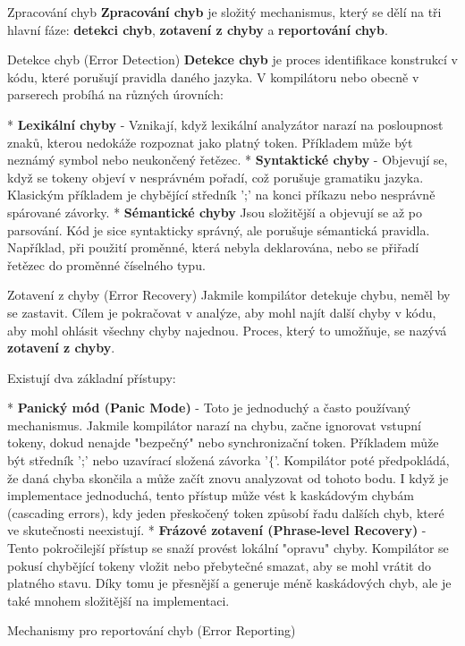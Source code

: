 \chap Zpracování chyb 
{\bf Zpracování chyb} je složitý mechanismus, který se dělí na tři hlavní fáze: {\bf detekci chyb}, {\bf zotavení z chyby} a {\bf reportování chyb}.

\sec Detekce chyb (Error Detection)
{\bf Detekce chyb} je proces identifikace konstrukcí v kódu, které porušují pravidla daného jazyka. V kompilátoru nebo obecně v parserech probíhá na různých úrovních: 

\begitems
* {\bf Lexikální chyby} - Vznikají, když lexikální analyzátor narazí na posloupnost znaků, kterou nedokáže rozpoznat jako platný token. Příkladem může být neznámý symbol nebo neukončený řetězec.
* {\bf Syntaktické chyby} - Objevují se, když se tokeny objeví v nesprávném pořadí, což porušuje gramatiku jazyka. Klasickým příkladem je chybějící středník ';' na konci příkazu nebo nesprávně spárované závorky.
* {\bf Sémantické chyby} Jsou složitější a objevují se až po parsování. Kód je sice syntakticky správný, ale porušuje sémantická pravidla. Například, při použití proměnné, která nebyla deklarována, nebo se přiřadí řetězec do proměnné číselného typu.
\enditems

\sec Zotavení z chyby (Error Recovery)
Jakmile kompilátor detekuje chybu, neměl by se zastavit. Cílem je pokračovat v analýze, aby mohl najít další chyby v kódu, aby mohl ohlásit všechny chyby najednou. Proces, který to umožňuje, se nazývá {\bf zotavení z chyby}.

Existují dva základní přístupy:

\begitems
* {\bf Panický mód (Panic Mode)} - Toto je jednoduchý a často používaný mechanismus. Jakmile kompilátor narazí na chybu, začne ignorovat vstupní tokeny, dokud nenajde "bezpečný" nebo synchronizační token. Příkladem může být středník ';' nebo uzavírací složená závorka '$\{$'. Kompilátor poté předpokládá, že daná chyba skončila a může začít znovu analyzovat od tohoto bodu. I když je implementace jednoduchá, tento přístup může vést k kaskádovým chybám (cascading errors), kdy jeden přeskočený token způsobí řadu dalších chyb, které ve skutečnosti neexistují.
* {\bf Frázové zotavení (Phrase-level Recovery)} - Tento pokročilejší přístup se snaží provést lokální "opravu" chyby. Kompilátor se pokusí chybějící tokeny vložit nebo přebytečné smazat, aby se mohl vrátit do platného stavu. Díky tomu je přesnější a generuje méně kaskádových chyb, ale je také mnohem složitější na implementaci.
\enditems

\sec Mechanismy pro reportování chyb (Error Reporting)

